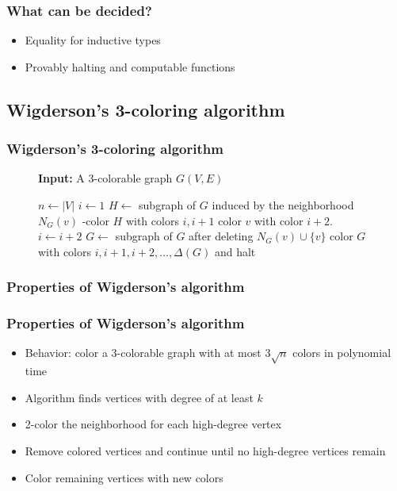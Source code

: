 \documentclass{beamer}
\begin{document}
\begin{frame}
\frametitle{What can be decided?}
\begin{itemize}
\item Equality for inductive types
\item Provably halting and computable functions
\end{itemize}
\end{frame}

\subsection{Wigderson's 3-coloring algorithm}
\begin{frame}
\frametitle{Wigderson's 3-coloring algorithm}

\begin{figure}[htbp]
  \textbf{Input:} A 3-colorable graph \(G(V, E)\)
  \begin{algorithmic}[1]
    \State $n \gets |V|$
    \State $i \gets 1$
    \State $H \gets$ subgraph of $G$ induced by the neighborhood $N_G(v)$
    -color $H$ with colors $i, i+1$
    \State color $v$ with color $i + 2$.
    \State $i \gets i + 2$
    \State $G \gets$ subgraph of $G$ after deleting $N_G(v) \cup \{v\}$
    \EndWhile
    \State color $G$ with colors $i, i + 1, i + 2, \dots, \Delta (G)$ and halt
  \end{algorithmic}
\end{figure}
\end{frame}

\subsubsection{Properties of Wigderson's algorithm}
\begin{frame}
\frametitle{Properties of Wigderson's algorithm}
\begin{itemize}
    \item Behavior: color a 3-colorable graph with at most \(3\sqrt{n}\) colors in polynomial time
    \item Algorithm finds vertices with degree of at least \(k\)
    \item 2-color the neighborhood for each high-degree vertex
    \item Remove colored vertices and continue until no high-degree vertices remain
    \item Color remaining vertices with new colors
\end{itemize}
\end{frame}
\end{document}
